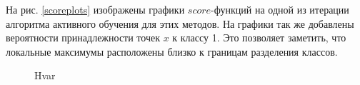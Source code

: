 \documentclass{llncs}
\begin{document}
На рис. \ref{scoreplots} изображены графики $score$-функций на одной из итерации алгоритма активного обучения для этих методов. На графики так же добавлены вероятности принадлежности точек $x$ к классу 1. Это позволяет заметить, что локальные максимумы расположены близко к границам разделения классов.
\vspace*{-0.5cm}
\begin{figure}[h]
\begin{minipage}[h]{0.49\linewidth}
\end{minipage}
\hfill
\begin{minipage}[h]{0.49\linewidth}
\end{minipage}
\vfill
\begin{minipage}[h]{0.49\linewidth}
 Hvar

\end{minipage}
\end{figure}
\end{document}
